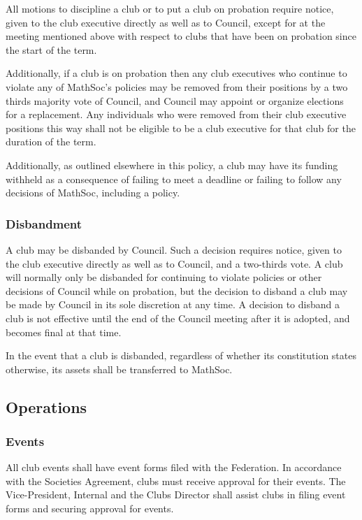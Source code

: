 All motions to discipline a club or to put a club on probation require notice,
given to the club executive directly as well as to Council, except for at the
meeting mentioned above with respect to clubs that have been on probation since
the start of the term.

Additionally, if a club is on probation then any club executives who continue
to violate any of MathSoc's policies may be removed from their positions by a
two thirds majority vote of Council, and Council may appoint or organize
elections for a replacement. Any individuals who were removed from their club
executive positions this way shall not be eligible to be a club executive for
that club for the duration of the term.

Additionally, as outlined elsewhere in this policy, a club may have its funding
withheld as a consequence of failing to meet a deadline or failing to follow any
decisions of MathSoc, including a policy.

\subsubsection{Disbandment}
A club may be disbanded by Council. Such a decision requires notice, given to
the club executive directly as well as to Council, and a two-thirds vote. A club
will normally only be disbanded for continuing to violate policies or other
decisions of Council while on probation, but the decision to disband a club may
be made by Council in its sole discretion at any time. A decision to disband a
club is not effective until the end of the Council meeting after it is adopted,
and becomes final at that time.

In the event that a club is disbanded, regardless of whether its constitution
states otherwise, its assets shall be transferred to MathSoc.

\subsection{Operations}
\subsubsection{Events}
All club events shall have event forms filed with the Federation. In accordance
with the Societies Agreement, clubs must receive approval for their events.  The
Vice-President, Internal and the Clubs Director shall assist clubs in filing
event forms and securing approval for events.

